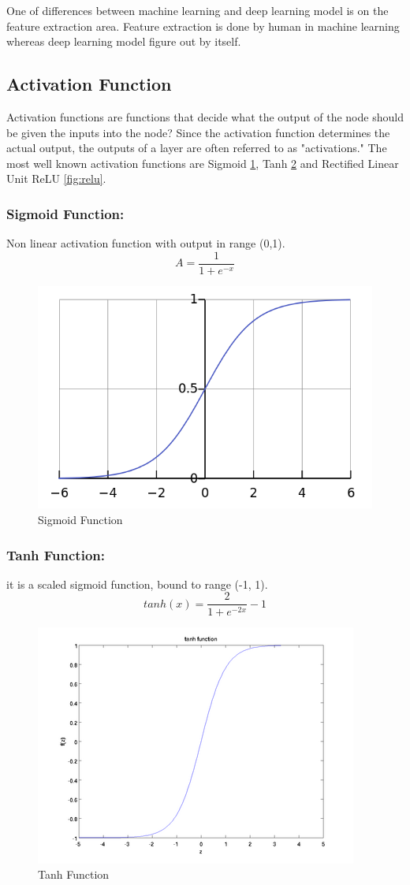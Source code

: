 \documentclass[12pt]{report}
\begin{document}
One of differences between machine learning and deep learning model 
is on the feature extraction area. Feature extraction is done by human
in machine learning whereas deep learning model figure out by itself.

\subsection{Activation Function}
Activation functions are functions that decide what the output of 
the node should be given the inputs into the node? 
Since the activation function determines the actual output, 
the outputs of a layer are often referred to as "activations."
The most well known activation functions are Sigmoid
\ref{fig:sigmoid}, Tanh \ref{fig:tanh} and
Rectified Linear Unit ReLU \ref{fig:relu}.

\subsubsection{Sigmoid Function:}
Non linear activation function with output in range (0,1).
$$ A = \frac{1}{1+e^{-x}} $$

\begin{figure} [h]
    \centering
    \includegraphics[width=.6\textwidth]{./images/sigmoid.png}
    \caption{Sigmoid Function}
    \label{fig:sigmoid}
\end{figure}

\subsubsection{Tanh Function:}
it is a scaled sigmoid function, bound to range (-1, 1).
$$ tanh(x) = \frac{2}{1+ e^{-2x}} - 1 $$

\begin{figure} [h]
    \centering
    \includegraphics[width=.5\textwidth]{./images/tanh.png}
    \caption{Tanh Function}
    \label{fig:tanh}
\end{figure}
\end{document}
